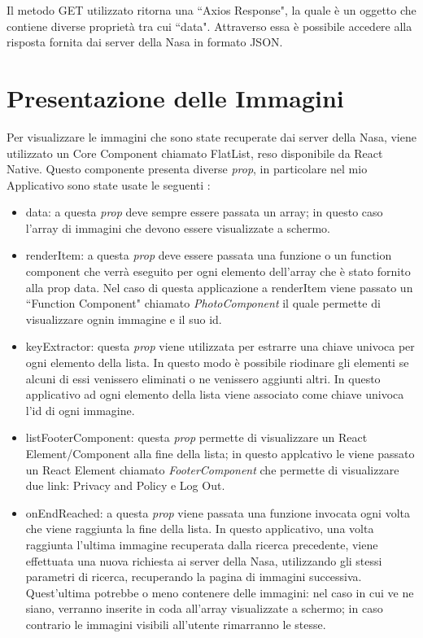 Il metodo GET utilizzato ritorna una ``Axios Response", la quale \`e un oggetto che contiene diverse propriet\`a tra cui ``data". Attraverso essa \`e possibile accedere alla risposta fornita dai server della Nasa in formato JSON.

\section{Presentazione delle Immagini}
Per visualizzare le immagini che sono state recuperate dai server della Nasa, viene utilizzato un Core Component chiamato FlatList, reso disponibile da React Native.
Questo componente presenta diverse \textit{prop}, in particolare nel mio Applicativo sono state usate le seguenti \cite{FlatList}:
\begin{itemize}
    \item data: a questa \textit{prop} deve sempre essere passata un array; in questo caso l'array di immagini che devono essere visualizzate a schermo.
    \item renderItem: a questa \textit{prop} deve essere passata una funzione o un function component che verr\`a eseguito per ogni elemento dell'array che \`e stato fornito alla prop data.
          Nel caso di questa applicazione a renderItem viene passato un ``Function Component" chiamato \textit{PhotoComponent} il quale permette di visualizzare ognin immagine e il suo id.
    \item keyExtractor: questa \textit{prop} viene utilizzata per estrarre una chiave univoca per ogni elemento della lista. In questo modo \`e possibile riodinare gli elementi se alcuni di essi venissero
          eliminati o ne venissero aggiunti altri. In questo applicativo ad ogni elemento della lista viene associato come chiave univoca l'id di ogni immagine.
    \item listFooterComponent: questa \textit{prop} permette di visualizzare un React Element/Component alla fine della lista; in questo applcativo le viene passato un React Element chiamato \textit{FooterComponent} che permette di visualizzare due link: Privacy and Policy e Log Out.
    \item onEndReached: a questa \textit{prop} viene passata una funzione invocata ogni volta che viene raggiunta la fine della lista.
          In questo applicativo, una volta raggiunta l'ultima immagine recuperata dalla ricerca precedente, viene effettuata una nuova richiesta ai server della Nasa, utilizzando gli stessi parametri di ricerca, recuperando la pagina di immagini successiva. Quest'ultima potrebbe o meno contenere delle immagini: nel caso
          in cui ve ne siano, verranno inserite in coda all'array visualizzate a schermo; in caso contrario le immagini visibili all'utente rimarranno le stesse.
\end{itemize}

